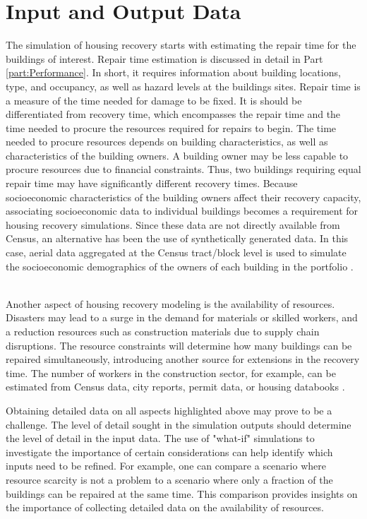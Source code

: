 \section{Input and Output Data} 
The simulation of housing recovery starts with estimating the repair time for the buildings of interest. Repair time estimation is discussed in detail in Part \ref{part:Performance}. In short, it requires information about building locations, type, and occupancy, as well as hazard levels at the buildings sites. Repair time is a measure of the time needed for damage to be fixed. It is should be differentiated from recovery time, which encompasses the repair time and the time needed to procure the resources required for repairs to begin. The time needed to procure resources depends on building characteristics, as well as characteristics of the building owners. A building owner may be less capable to procure resources due to financial constraints. Thus, two buildings requiring equal repair time may have significantly different recovery times. Because socioeconomic characteristics of the building owners affect their recovery capacity, associating socioeconomic data to individual buildings becomes a requirement for housing recovery simulations. Since these data are not directly available from Census, an alternative has been the use of synthetically generated data. In this case, aerial data aggregated at the Census tract/block level is used to simulate the socioeconomic demographics of the owners of each building in the portfolio \citep{rosenheim2019integration}. \ 

Another aspect of housing recovery modeling is the availability of resources. Disasters may lead to a surge in the demand for materials or skilled workers, and a reduction resources such as construction materials due to supply chain disruptions. The resource constraints will determine how many buildings can be repaired simultaneously, introducing another source for extensions in the recovery time. The number of workers in the construction sector, for example, can be estimated from Census data, city reports, permit data, or housing databooks \citep{kang2018replicating, costa2020housing}. \

Obtaining detailed data on all aspects highlighted above may prove to be a challenge. The level of detail sought in the simulation outputs should determine the level of detail in the input data. The use of "what-if" simulations to investigate the importance of certain considerations can help identify which inputs need to be refined. For example, one can compare a scenario where resource scarcity is not a problem to a scenario where only a fraction of the buildings can be repaired at the same time. This comparison provides insights on the importance of collecting detailed data on the availability of resources.\ 

